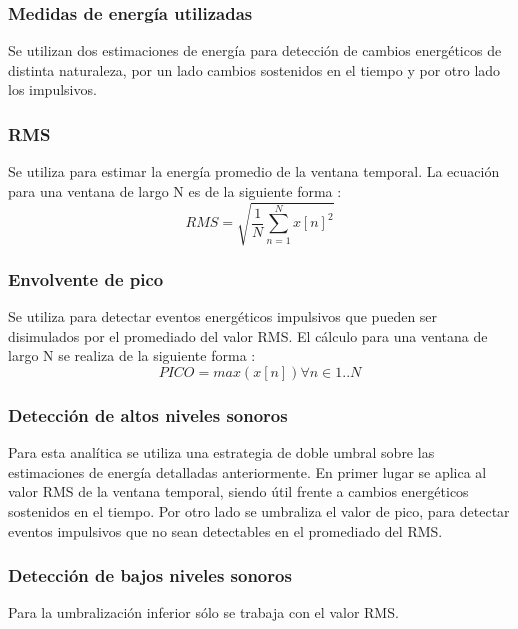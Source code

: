 \documentclass{article}
\begin{document}
\subsubsection{Medidas de energía utilizadas}
Se utilizan dos estimaciones de energía para detección de cambios energéticos de distinta naturaleza, por un lado cambios sostenidos en el tiempo y por otro lado los impulsivos.

\subsubsection*{RMS}
Se utiliza para estimar la energía promedio de la ventana temporal. La ecuación para una ventana de largo N es de la siguiente forma \cite[Chapter~4]{Lerch:2012:IAC:2392638}:
\begin{equation}
RMS = \sqrt{\frac{1}{N}\sum_{n=1}^{N} x[n]^2}
\end{equation}

\subsubsection*{Envolvente de pico}
Se utiliza para detectar eventos energéticos impulsivos que pueden ser disimulados por el promediado del valor RMS. El cálculo para una ventana de largo N se realiza de la siguiente forma \cite[Chapter~4]{Lerch:2012:IAC:2392638}:
\begin{equation}
PICO = max(x[n])\forall n \in 1..N 
\end{equation}

\subsubsection{Detección de altos niveles sonoros}
Para esta analítica se utiliza una estrategia de doble umbral sobre las estimaciones de energía detalladas anteriormente. En primer lugar se aplica al valor RMS de la ventana temporal, siendo útil frente a cambios energéticos sostenidos en el tiempo. Por otro lado se umbraliza el valor de pico, para detectar eventos impulsivos que no sean detectables en el promediado del RMS.

\subsubsection{Detección de bajos niveles sonoros}
Para la umbralización inferior sólo se trabaja con el valor RMS.
\end{document}
